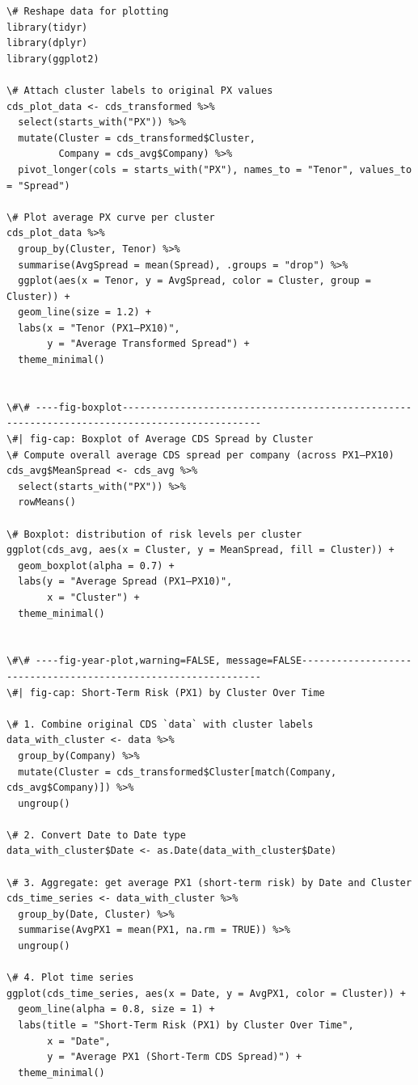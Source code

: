 \documentclass[
  letterpaper,
  DIV=11,
  numbers=noendperiod]{scrartcl}
\begin{document}
\begin{verbatim}
\# Reshape data for plotting
library(tidyr)
library(dplyr)
library(ggplot2)

\# Attach cluster labels to original PX values
cds_plot_data <- cds_transformed %>%
  select(starts_with("PX")) %>%
  mutate(Cluster = cds_transformed$Cluster,
         Company = cds_avg$Company) %>%
  pivot_longer(cols = starts_with("PX"), names_to = "Tenor", values_to = "Spread")

\# Plot average PX curve per cluster
cds_plot_data %>%
  group_by(Cluster, Tenor) %>%
  summarise(AvgSpread = mean(Spread), .groups = "drop") %>%
  ggplot(aes(x = Tenor, y = AvgSpread, color = Cluster, group = Cluster)) +
  geom_line(size = 1.2) +
  labs(x = "Tenor (PX1–PX10)",
       y = "Average Transformed Spread") +
  theme_minimal()


\#\# ----fig-boxplot----------------------------------------------------------------------------------------------
\#| fig-cap: Boxplot of Average CDS Spread by Cluster
\# Compute overall average CDS spread per company (across PX1–PX10)
cds_avg$MeanSpread <- cds_avg %>%
  select(starts_with("PX")) %>%
  rowMeans()

\# Boxplot: distribution of risk levels per cluster
ggplot(cds_avg, aes(x = Cluster, y = MeanSpread, fill = Cluster)) +
  geom_boxplot(alpha = 0.7) +
  labs(y = "Average Spread (PX1–PX10)",
       x = "Cluster") +
  theme_minimal()


\#\# ----fig-year-plot,warning=FALSE, message=FALSE---------------------------------------------------------------
\#| fig-cap: Short-Term Risk (PX1) by Cluster Over Time

\# 1. Combine original CDS `data` with cluster labels
data_with_cluster <- data %>%
  group_by(Company) %>%
  mutate(Cluster = cds_transformed$Cluster[match(Company, cds_avg$Company)]) %>%
  ungroup()

\# 2. Convert Date to Date type
data_with_cluster$Date <- as.Date(data_with_cluster$Date)

\# 3. Aggregate: get average PX1 (short-term risk) by Date and Cluster
cds_time_series <- data_with_cluster %>%
  group_by(Date, Cluster) %>%
  summarise(AvgPX1 = mean(PX1, na.rm = TRUE)) %>%
  ungroup()

\# 4. Plot time series
ggplot(cds_time_series, aes(x = Date, y = AvgPX1, color = Cluster)) +
  geom_line(alpha = 0.8, size = 1) +
  labs(title = "Short-Term Risk (PX1) by Cluster Over Time",
       x = "Date",
       y = "Average PX1 (Short-Term CDS Spread)") +
  theme_minimal()



\end{verbatim}
\end{document}
